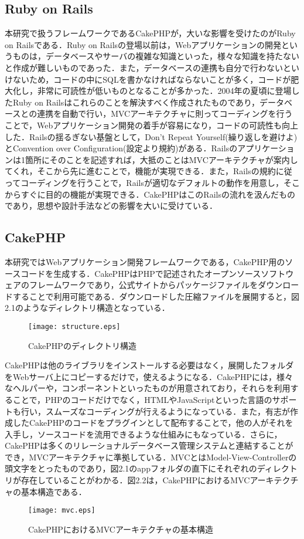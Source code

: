 \documentclass{funthesis}
\begin{document}
\subsection{Ruby on Rails}
本研究で扱うフレームワークであるCakePHPが，大いな影響を受けたのがRuby on Railsである．Ruby on Railsの登場以前は，Webアプリケーションの開発というものは，データベースやサーバの複雑な知識といった，様々な知識を持たないと作成が難しいものであった．また，データベースの連携も自分で行わないといけないため，コードの中にSQLを書かなければならないことが多く，コードが肥大化し，非常に可読性が低いものとなることが多かった．2004年の夏頃に登場したRuby on Railsはこれらのことを解決すべく作成されたものであり，データベースとの連携を自動で行い，MVCアーキテクチャに則ってコーディングを行うことで，Webアプリケーション開発の着手が容易になり，コードの可読性も向上した．Railsの揺るぎない基盤として，Don't Repeat Yourself(繰り返しを避けよ)とConvention over Configuration(設定より規約)\cite{agiruby}がある．Railsのアプリケーションは1箇所にそのことを記述すれば，大抵のことはMVCアーキテクチャが案内してくれ，そこから先に進むことで，機能が実現できる．また，Railsの規約に従ってコーディングを行うことで，Railsが適切なデフォルトの動作を用意し，そこからすぐに目的の機能が実現できる．CakePHPはこのRailsの流れを汲んだものであり，思想や設計手法などの影響を大いに受けている．

\subsection{CakePHP}
本研究ではWebアプリケーション開発フレームワークである，CakePHP用のソースコードを生成する．CakePHPはPHPで記述されたオープンソースソフトウェアのフレームワークであり，公式サイト\cite{cakephp}からパッケージファイルをダウンロードすることで利用可能である．ダウンロードした圧縮ファイルを展開すると，図2.1のようなディレクトリ構造となっている．
\begin{figure}[htpb]
\begin{center}
\texttt{[image: structure.eps]}
\caption{CakePHPのディレクトリ構造}
\end{center}
\end{figure}

CakePHPは他のライブラリをインストールする必要はなく，展開したフォルダをWebサーバ上にコピーするだけで，使えるようになる\cite{cakebook}．CakePHPには，様々なヘルパーや，コンポーネントといったものが用意されており，それらを利用することで，PHPのコードだけでなく，HTMLやJavaScriptといった言語のサポートも行い，スムーズなコーディングが行えるようになっている．また，有志が作成したCakePHPのコードをプラグインとして配布することで，他の人がそれを入手し，ソースコードを流用できるような仕組みにもなっている．さらに，CakePHPは多くのリレーショナルデータベース管理システムと連結することができ，MVCアーキテクチャに準拠している．MVCとはModel-View-Controllerの頭文字をとったものであり，図2.1のappフォルダの直下にそれぞれのディレクトリが存在していることがわかる．図2.2は，CakePHPにおけるMVCアーキテクチャの基本構造である．
\begin{figure}[htpb]
\begin{center}
\texttt{[image: mvc.eps]}
\caption{CakePHPにおけるMVCアーキテクチャの基本構造}
\end{center}
\end{figure}
\end{document}
